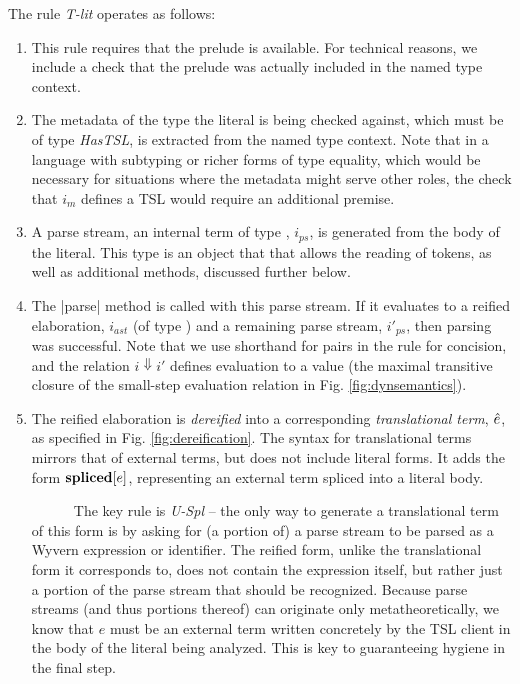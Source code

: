 \noindent
The rule \textit{T-lit} operates as follows:
\begin{enumerate}
\setlength{\itemsep}{1pt}
\item This rule requires that the prelude is available. For technical reasons, we include a check that the prelude was actually included in the named type context.
\item The metadata of the type the literal is being checked against, which must be of type \textit{HasTSL}, is extracted from the named type context. Note that in a language with subtyping or richer forms of type equality, which would be necessary for situations where the metadata might serve other roles, the check that $i_m$ defines a TSL would require an additional premise. 
\item A parse stream, an internal term of type , $i_{ps}$, is generated from the body of the literal. This type is an object that that allows the reading of tokens, as well as additional methods, discussed further below.
\item The \li|parse| method is called with this parse stream. If it evaluates to a reified elaboration, $i_{ast}$ (of type ) and a remaining parse stream, $i'_{ps}$, then parsing was successful. Note that we use shorthand for pairs in the rule for concision, and the relation $i \Downarrow i'$ defines evaluation to a value (the maximal transitive closure of the small-step evaluation relation in Fig. \ref{fig:dynsemantics}).
\item The reified elaboration is \emph{dereified} into a corresponding \emph{translational term}, $\hat{e}$, as specified in Fig. \ref{fig:dereification}. The syntax for translational terms mirrors that of external terms, but does not include literal forms. It adds the form $\textbf{spliced}[e]$, representing an external term  spliced into a literal body. 

~~~~~~The key rule is \textit{U-Spl} -- the only way to generate a translational term of this form is by asking for (a portion of) a parse stream to be parsed as a Wyvern expression or identifier. The reified form, unlike the translational form it corresponds to, does not contain the expression itself, but rather just a portion of the parse stream that should be recognized. Because parse streams (and thus portions thereof) can originate only metatheoretically, we know that $e$ must be an external term written concretely by the TSL client in the body of the literal being analyzed. This is key to guaranteeing hygiene in the final step.


\end{enumerate}
